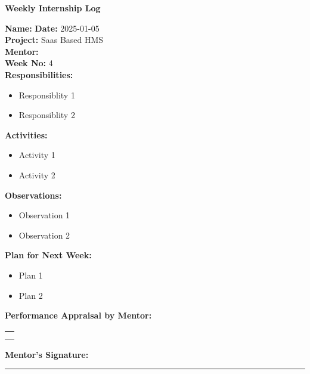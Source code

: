 \begin{center}
  \bfseries Weekly Internship Log
\end{center}

\noindent
\textbf{Name:}  \hfill \textbf{Date:} 2025-01-05 \\
\textbf{Project:} Saas Based HMS \hfill \\
\textbf{Mentor:}   \\
\textbf{Week No:} 4 \\

\noindent
\textbf{Responsibilities:}
\begin{itemize}
    \item Responsiblity 1
    \item Responsiblity 2
\end{itemize}

\noindent
\textbf{Activities:}
\begin{itemize}
    \item Activity 1
    \item Activity 2
\end{itemize}

\noindent
\textbf{Observations:}
\begin{itemize}
    \item Observation 1
    \item Observation 2
\end{itemize}

\noindent
\textbf{Plan for Next Week:}
\begin{itemize}
    \item  Plan 1
    \item Plan 2
\end{itemize}

\noindent
\textbf{Performance Appraisal by Mentor:} \\
\begin{table}[h]
    \centering
    \noindent
    \begin{tabularx}{\textwidth} { 
        | >{\centering\arraybackslash}X| }

        \hline
          \\ \\       	                    
        \hline
    \end{tabularx}
\end{table}


\vspace{2em}
\noindent
\textbf{Mentor’s Signature:} \\
\rule{0.4\textwidth}{0.5pt}
